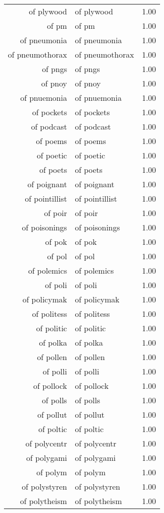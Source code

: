 \begin{table}[ht]
\begin{tabular}{rlr}
  of plywood & of plywood & 1.00 \\ 
  of pm & of pm & 1.00 \\ 
  of pneumonia & of pneumonia & 1.00 \\ 
  of pneumothorax & of pneumothorax & 1.00 \\ 
  of pngs & of pngs & 1.00 \\ 
  of pnoy & of pnoy & 1.00 \\ 
  of pnuemonia & of pnuemonia & 1.00 \\ 
  of pockets & of pockets & 1.00 \\ 
  of podcast & of podcast & 1.00 \\ 
  of poems & of poems & 1.00 \\ 
  of poetic & of poetic & 1.00 \\ 
  of poets & of poets & 1.00 \\ 
  of poignant & of poignant & 1.00 \\ 
  of pointillist & of pointillist & 1.00 \\ 
  of poir & of poir & 1.00 \\ 
  of poisonings & of poisonings & 1.00 \\ 
  of pok & of pok & 1.00 \\ 
  of pol & of pol & 1.00 \\ 
  of polemics & of polemics & 1.00 \\ 
  of poli & of poli & 1.00 \\ 
  of policymak & of policymak & 1.00 \\ 
  of politess & of politess & 1.00 \\ 
  of politic & of politic & 1.00 \\ 
  of polka & of polka & 1.00 \\ 
  of pollen & of pollen & 1.00 \\ 
  of polli & of polli & 1.00 \\ 
  of pollock & of pollock & 1.00 \\ 
  of polls & of polls & 1.00 \\ 
  of pollut & of pollut & 1.00 \\ 
  of poltic & of poltic & 1.00 \\ 
  of polycentr & of polycentr & 1.00 \\ 
  of polygami & of polygami & 1.00 \\ 
  of polym & of polym & 1.00 \\ 
  of polystyren & of polystyren & 1.00 \\ 
  of polytheism & of polytheism & 1.00 \\ 

\end{tabular}
\end{table}
